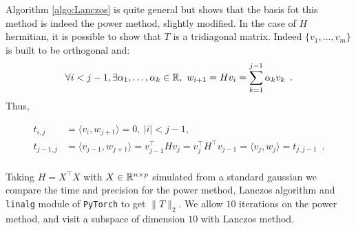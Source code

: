 \documentclass[a4]{article}
\begin{document}
Algorithm \ref{algo:Lanczos} is quite general but shows that the basis fot this method is indeed the power method, slightly modified.
In the case of $H$ hermitian, it is possible to show that $T$ is a tridiagonal matrix. Indeed $\{v_1, \dots, v_m\}$ is built to be orthogonal and:
\[\forall i < j-1,\exists \alpha_1, \dots, \alpha_k \in \mathbb{R},\   w_{i+1} = Hv_i = \sum_{k=1}^{j-1} \alpha_k v_k\enspace. \]
Thus,

\begin{align*}
	t_{i, j} &= \langle v_i, w_{j+1}\rangle = 0,\ |i|<j-1,\\
	t_{j-1, j} &= \langle v_{j-1}, w_{j+1}\rangle = v_{j-1}^\top H v_{j} = v_{j}^\top H^\top v_{j-1} = \langle v_j, w_j\rangle = t_{j, j-1}\enspace. \\
\end{align*}

Taking $H=X^\top X$ with $X \in \mathbb{R}^{n\times p}$ simulated from a standard gaussian we compare the time and precision for the power method, Lanczos algorithm and \texttt{linalg} module of \texttt{PyTorch} to get $\|T\|_2$.
We allow $10$ iterations on the power method, and visit a subspace of dimension $10$ with Lanczos method.
\end{document}
